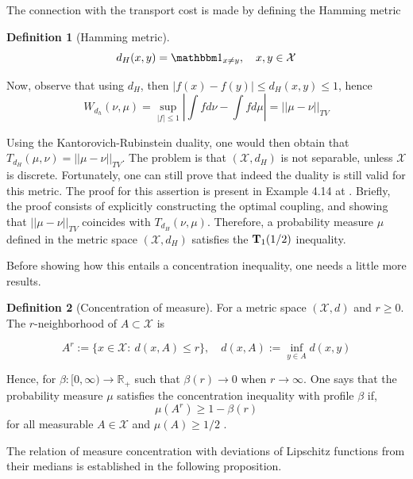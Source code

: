 \documentclass[10pt]{article}
\theoremstyle{definition}
\newtheorem{definition}{Definition}[section]
\begin{document}
The connection with the transport cost is made by defining the Hamming metric
\begin{definition}[Hamming metric]
$$d_H(x,y) = \mathbbm 1_{x \neq y}, \quad x,y \in \mathcal X$$
\end{definition}

Now, observe that using $d_H$, then $|f(x) - f(y)| \leq d_H(x,y) \leq 1$, hence
\begin{equation}
W_{d_h}(\nu, \mu) = \sup_{|f|\leq 1} \left |
\int f d\nu - \int f d\mu	
\right | = || \mu - \nu ||_{TV}
\end{equation}

Using the Kantorovich-Rubinstein duality, one would then obtain that
$T_{d_H}(\mu,\nu) =|| \mu - \nu ||_{TV} $. The problem is that $(\mathcal X, d_H)$
is not separable, unless $\mathcal X$ is discrete. Fortunately, one can still prove
that indeed the duality is still valid for this metric. The proof for this assertion
is present in Example 4.14 at \citet{van2014probability}. Briefly, the proof consists
of explicitly constructing the optimal coupling, and showing that $|| \mu - \nu ||_{TV}$
coincides with $T_{d_H}(\nu,\mu)$.
Therefore, a probability measure $\mu$ defined in the metric space $(\mathcal X, d_H)$
satisfies the $\textbf T_1(1/2)$ inequality.

Before showing how this entails a
concentration inequality, one needs a little more results.

\begin{definition}[Concentration of measure]
For a metric space $(\mathcal X, d)$ and $r \geq 0$. The $r$-neighborhood of
$A \subset \mathcal X$ is

$$
A^r := \{
x \in \mathcal X: \ d(x,A) \leq r
\},
\quad d(x,A) := \inf_{y \in A} d(x,y)
$$

Hence, for $\beta: [0,\infty) \rightarrow \mathbb R_+$ such that $\beta(r) \rightarrow 0$
when $r \rightarrow \infty$. One says that the probability measure $\mu$ satisfies the
concentration inequality with profile $\beta$ if,
$$
\mu(A^r) \geq 1 - \beta(r)
$$
for all measurable $A \in \mathcal X$ and $\mu(A) \geq 1/2$ .
\end{definition}

The relation of measure concentration with deviations of Lipschitz functions
from their medians is established in the following proposition.
\end{document}
